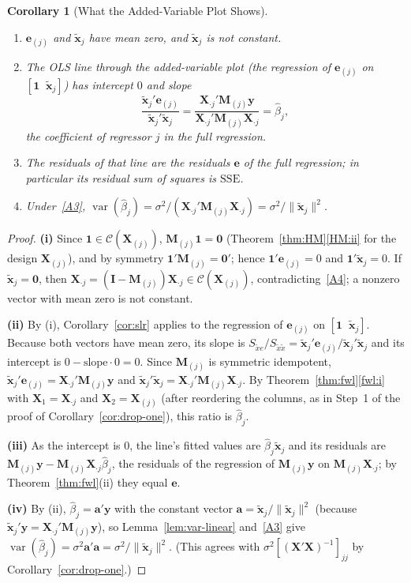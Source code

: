 \documentclass[14pt]{extarticle}
\theoremstyle{plain}
\newtheorem{corollary}[theorem]{Corollary}
\theoremstyle{definition}
\theoremstyle{remark}
\DeclareMathOperator\var{var}
\newcommand{\SSE}{\mathrm{SSE}}
\newcommand{\bX}{\mathbf{X}}
\newcommand{\by}{\mathbf{y}}
\newcommand{\bx}{\mathbf{x}}
\newcommand{\bI}{\mathbf{I}}
\newcommand{\bM}{\mathbf{M}}
\newcommand{\bone}{\mathbf{1}}
\newcommand{\bzero}{\mathbf{0}}
\newcommand{\ba}{\mathbf{a}}
\newcommand{\calC}{\mathcal{C}}
\begin{document}
\begin{corollary}[What the Added-Variable Plot Shows]\label{cor:avp}
\leavevmode
\begin{enumerate}[label=\textup{(\roman*)}]
\item\label{avp:i} $\mathbf{e}_{(j)}$ and $\tilde{\bx}_j$ have mean zero, and $\tilde{\bx}_j$ is not constant.
\item\label{avp:ii} The OLS line through the added-variable plot (the regression of $\mathbf{e}_{(j)}$ on $[\bone \;\; \tilde{\bx}_j]$) has intercept $0$ and slope
\[
\frac{\tilde{\bx}_j'\mathbf{e}_{(j)}}{\tilde{\bx}_j'\tilde{\bx}_j} = \frac{\bX_{\cdot j}'\bM_{(j)}\by}{\bX_{\cdot j}'\bM_{(j)}\bX_{\cdot j}} = \hat\beta_j,
\]
the coefficient of regressor $j$ in the full regression.
\item The residuals of that line are the residuals $\mathbf{e}$ of the full regression; in particular its residual sum of squares is $\SSE$.
\item\label{avp:iv} Under~\ref{A3}, $\var(\hat\beta_j) = \sigma^2/(\bX_{\cdot j}'\bM_{(j)}\bX_{\cdot j}) = \sigma^2/\|\tilde{\bx}_j\|^2$.
\end{enumerate}
\end{corollary}

\begin{proof}
\textbf{(i)} Since $\bone \in \calC(\bX_{(j)})$, $\bM_{(j)}\bone = \bzero$ (Theorem~\ref{thm:HM}\ref{HM:ii} for the design $\bX_{(j)}$), and by symmetry $\bone'\bM_{(j)} = \bzero'$; hence $\bone'\mathbf{e}_{(j)} = 0$ and $\bone'\tilde{\bx}_j = 0$. If $\tilde{\bx}_j = \bzero$, then $\bX_{\cdot j} = (\bI - \bM_{(j)})\bX_{\cdot j} \in \calC(\bX_{(j)})$, contradicting~\ref{A4}; a nonzero vector with mean zero is not constant.

\textbf{(ii)} By (i), Corollary~\ref{cor:slr} applies to the regression of $\mathbf{e}_{(j)}$ on $[\bone \;\; \tilde{\bx}_j]$. Because both vectors have mean zero, its slope is $S_{\tilde x e}/S_{\tilde x\tilde x} = \tilde{\bx}_j'\mathbf{e}_{(j)}/\tilde{\bx}_j'\tilde{\bx}_j$ and its intercept is $0 - \text{slope}\cdot 0 = 0$. Since $\bM_{(j)}$ is symmetric idempotent, $\tilde{\bx}_j'\mathbf{e}_{(j)} = \bX_{\cdot j}'\bM_{(j)}\by$ and $\tilde{\bx}_j'\tilde{\bx}_j = \bX_{\cdot j}'\bM_{(j)}\bX_{\cdot j}$. By Theorem~\ref{thm:fwl}\ref{fwl:i} with $\bX_1 = \bX_{\cdot j}$ and $\bX_2 = \bX_{(j)}$ (after reordering the columns, as in Step~1 of the proof of Corollary~\ref{cor:drop-one}), this ratio is $\hat\beta_j$.

\textbf{(iii)} As the intercept is $0$, the line's fitted values are $\hat\beta_j\tilde{\bx}_j$ and its residuals are $\bM_{(j)}\by - \bM_{(j)}\bX_{\cdot j}\hat\beta_j$, the residuals of the regression of $\bM_{(j)}\by$ on $\bM_{(j)}\bX_{\cdot j}$; by Theorem~\ref{thm:fwl}(ii) they equal $\mathbf{e}$.

\textbf{(iv)} By (ii), $\hat\beta_j = \ba'\by$ with the constant vector $\ba = \tilde{\bx}_j/\|\tilde{\bx}_j\|^2$ (because $\tilde{\bx}_j'\by = \bX_{\cdot j}'\bM_{(j)}\by$), so Lemma~\ref{lem:var-linear} and~\ref{A3} give $\var(\hat\beta_j) = \sigma^2\ba'\ba = \sigma^2/\|\tilde{\bx}_j\|^2$. (This agrees with $\sigma^2[(\bX'\bX)^{-1}]_{jj}$ by Corollary~\ref{cor:drop-one}.)
\end{proof}
\end{document}
